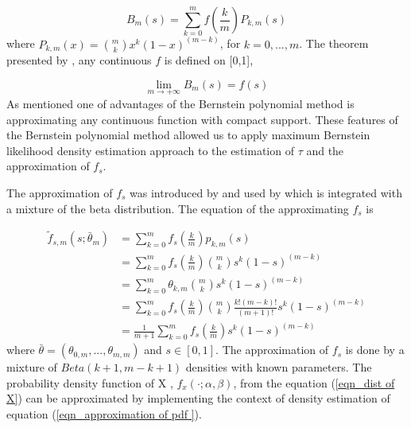 \begin{equation} \label{eqn_bernstein polynomial_f_s}
    B_m(s) = \displaystyle \sum_{k=0}^{m}f\left(\frac{k}{m}\right) P_{k,m}(s)
\end{equation}
where $P_{k,m}(x) = \binom{m}{k} x^k(1-x)^{(m-k)}$, for $k=0, ..., m$. The theorem presented by \cite{lorentz2013bernstein},  any continuous $f$ is defined on [0,1],

\begin{equation} \label{theorem_lorentz}
    \lim_{m \to +\infty} B_m(s) = f(s)
\end{equation}
As \cite{guan2016efficient} mentioned one of advantages of the Bernstein polynomial method is approximating any continuous function with compact support. These features of the Bernstein polynomial method allowed us to apply maximum Bernstein likelihood density estimation approach to the estimation of $\tau$ and the approximation of $f_s$.

The approximation of $f_s$ was introduced by \cite{bertrand2019flexible} and used by \cite{guan2016efficient} which is integrated with a mixture of the beta distribution. The equation of the approximating $f_s$ is

\begin{equation} \label{eqn_approximation of pdf }
\begin{split}
 \tilde f_{s,m}(s; \bar{\theta}_m) &= \displaystyle \sum_{k=0}^m f_s\left(\frac{k}{m}\right) p_{k,m}(s)\\
 & =\displaystyle  \sum_{k=0}^m f_s\left(\frac{k}{m}\right) \binom{m}{k} s^k(1-s)^{(m-k)}\\
 & = \displaystyle \sum_{k=0}^m \theta_{k,m}\binom{m}{k} s^k(1-s)^{(m-k)}\\
 & = \displaystyle \sum_{k=0}^m f_s\left(\frac{k}{m}\right) \binom{m}{k}\frac{k! (m-k)!}{(m+1)!}  s^k(1-s)^{(m-k)}\\
  & = \frac{1}{m+1}\displaystyle \sum_{k=0}^mf_s\left(\frac{k}{m}\right)s^k(1-s)^{(m-k)}
\end{split}
\end{equation}
where $\bar{\theta} = (\theta_{0,m}, ..., \theta_{m,m})$ and $s\in [0,1]$. The approximation of $f_s$ is done by a mixture of $Beta(k+1, m-k+1)$ densities with known parameters. The probability density function of X ,  $f_x(\cdot; \alpha, \beta)$, from the equation (\ref{eqn_dist of X}) can be approximated by implementing the context of density estimation of equation (\ref{eqn_approximation of pdf }).

